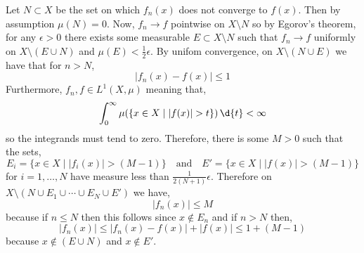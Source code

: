 \documentclass[12pt]{article}
\begin{document}
Let $N \subset X$ be the set on which $f_n(x)$ does not converge to $f(x)$. Then by assumption $\mu(N) = 0$. Now, $f_n \to f$ pointwise on $X \setminus N$ so by Egorov's theorem, for any $\epsilon > 0$ there exists some measurable $E \subset X \setminus N$ such that $f_n \to f$ uniformly on $X \setminus (E \cup N)$ and $\mu(E) < \tfrac{1}{2} \epsilon$. 
By unifom convergence, on $X \setminus (N \cup E)$ we have that for $n > N$,
\[ | f_n(x) - f(x) | \le 1 \] 
Furthermore, $f_n, f \in L^1(X, \mu)$ meaning that,
\[ \int_0^{\infty} \mu(\{ x \in X \mid |f(x)| > t \}) \, \d{t} < \infty \]
so the integrands must tend to zero. Therefore, there is some $M > 0$ such that the sets,
\[ E_i = \{ x \in X \mid |f_i(x)| > (M - 1) \} \quad \text{and} \quad E' = \{ x \in X \mid |f(x)| > (M - 1) \} \]
for $i = 1,\dots, N$ have measure less than $\tfrac{1}{2 (N+1)} \epsilon$.  
Therefore on $X \setminus (N \cup E_1 \cup \cdots \cup E_N \cup E')$ we have,
\[ | f_n(x) | \le M \]
because if $n \le N$ then this follows since $x \notin E_n$ and if $n > N$ then,
\[ | f_n(x) | \le |f_n(x) - f(x)| + |f(x)| \le 1 + (M - 1) \]
because $x \notin (E \cup N)$ and $x \notin E'$.
\end{document}
